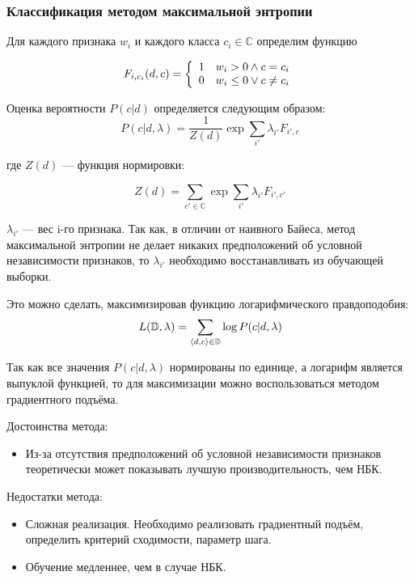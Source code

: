 \subsubsection{Классификация методом максимальной энтропии}

Для каждого признака $w_i$ и каждого класса $c_i \in \mathbb{C}$
определим функцию

\begin{equation}
F_{i, c_i}(d, c) = \left\{
\begin{array}{c l}
    1 & {w_i > 0 \wedge c = c_i}  \\   
    0 & {w_i \leq 0\vee c \neq  c_i}
\end{array}\right.
\end{equation}

Оценка вероятности $P(c | d)$ определяется следующим образом:
\begin{equation}
P(c | d, \lambda) = \frac{1}{Z(d)} \exp{\sum\limits_{i'} \lambda_{i'} F_{i', c}}
\end{equation}

где $Z(d)$ --- функция нормировки:

\begin{equation}
Z(d) = \sum\limits_{c' \in \mathbb{C}} \exp{\sum\limits_{i'} \lambda_{i'} F_{i', c'}}
\end{equation}

$\lambda_{i'}$ --- вес i-го признака. Так как, в отличии от наивного Байеса,
метод максимальной энтропии не делает никаких предположений
об условной независимости признаков, то $\lambda_{i'}$ необходимо
восстанавливать из обучающей выборки.

Это можно сделать, максимизировав функцию логарифмического правдоподобия:
\begin{equation}
L(\mathbb{D}, \lambda) = \sum\limits_{\left \langle d, c \right \rangle  \in \mathbb{D}} \log P(c|d, \lambda)
\end{equation}

Так как все значения $P(c|d, \lambda)$ нормированы по единице, а логарифм является выпуклой функцией, то для максимизации можно воспользоваться
методом градиентного подъёма.

Достоинства метода:
\begin{itemize}

\item
Из-за отсутствия предположений об условной независимости признаков
теоретически может показывать лучшую производительность, чем
НБК.

\end{itemize}

Недостатки метода:
\begin{itemize}

\item
Сложная реализация. Необходимо реализовать градиентный подъём,
определить критерий сходимости, параметр шага.

\item
Обучение медленнее, чем в случае НБК.

\end{itemize}